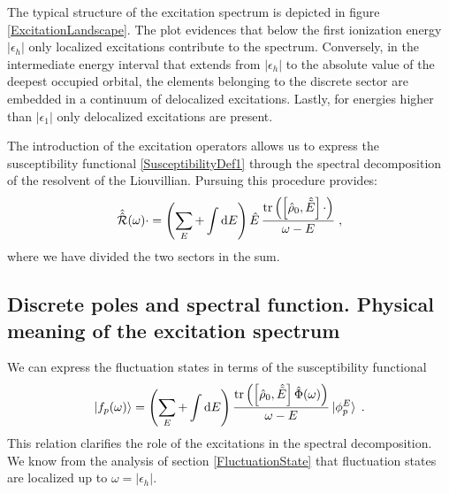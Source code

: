 \documentclass[reprint,aps,prb]{revtex4-1}
\newcommand{\dd}{{\rm d}}
\newcommand{\eps}{\epsilon}
\newcommand{\be}{\begin{equation}}
\newcommand{\ee}{\end{equation}}
\newcommand{\nn}{\notag}
\newcommand{\lb}{\label}
\newcommand{\op}[1]{\hat {#1}}
\newcommand{\sop}[1]{\op{\op {#1}}}
\newcommand{\commutator}[2]{\left[ {#1} , {#2} \right]}
\newcommand{\trace}[1]{\mathrm{tr}\left(#1\right)}
\newcommand{\dmnot}{\op{\rho}_0}
\begin{document}
The typical structure of the excitation spectrum is depicted in figure \ref{ExcitationLandscape}. The plot evidences that below the first ionization energy $|\eps_h|$ only localized excitations contribute
to the spectrum. Conversely, in the intermediate energy interval that extends from $|\eps_h|$ to the absolute value of the deepest occupied orbital, the elements belonging to the discrete sector are embedded 
in a continuum of delocalized excitations. Lastly, for energies higher than $|\eps_1|$ only delocalized excitations are present. 

The introduction of the excitation operators allows us to express the susceptibility functional \eqref{SusceptibilityDef1} through the spectral decomposition of the resolvent of the 
Liouvillian. Pursuing this procedure provides:
\be\lb{RhopExcitationDef1}
\sop{{\cal R}}(\omega) \cdot   =
\left(\sum_E + \int\dd E   \right) \op E \,
\frac{\trace{\commutator{\dmnot}{\op{\tilde E}}\cdot}}{\omega-E} \;,
\ee 
where we have divided the two sectors in the sum. 



\subsection{Discrete poles and spectral function. Physical meaning of the excitation spectrum} %

We can express the fluctuation states in terms of the susceptibility functional
\be\lb{FluctuationStateExcitationDef1}
\ket{f_p(\omega)}   =
\left(\sum_E + \int\dd E   \right) 
\frac{\trace{\commutator{\dmnot}{\op{\tilde E}}\op\Phi(\omega)}}{\omega-E} \ket{\phi^E_p} \;. \nn
\ee 
This relation clarifies the role of the excitations in the spectral decomposition. We know from the analysis of section \ref{FluctuationState} that fluctuation states are localized
up to $\omega=|\eps_h|$. 
\end{document}
